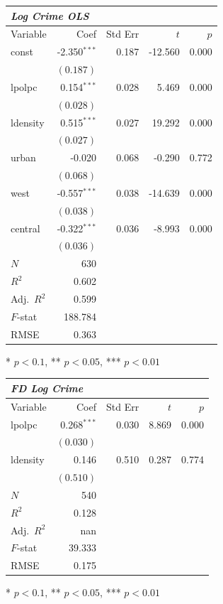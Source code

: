 \documentclass{article}
\begin{document}
\renewcommand{\arraystretch}{1.1}
\setlength{\tabcolsep}{6pt}
\begin{tabular}{lrrrr}
\hline
\multicolumn{5}{l}{\textit{Log Crime OLS}} \\
\hline
Variable & Coef & Std Err & $t$ & $p$ \\
\hline
const & -2.350$^{\ast\ast\ast}$ & 0.187 & -12.560 & 0.000 \\
 & $(0.187)$ & & & \\
lpolpc & 0.154$^{\ast\ast\ast}$ & 0.028 & 5.469 & 0.000 \\
 & $(0.028)$ & & & \\
ldensity & 0.515$^{\ast\ast\ast}$ & 0.027 & 19.292 & 0.000 \\
 & $(0.027)$ & & & \\
urban & -0.020 & 0.068 & -0.290 & 0.772 \\
 & $(0.068)$ & & & \\
west & -0.557$^{\ast\ast\ast}$ & 0.038 & -14.639 & 0.000 \\
 & $(0.038)$ & & & \\
central & -0.322$^{\ast\ast\ast}$ & 0.036 & -8.993 & 0.000 \\
 & $(0.036)$ & & & \\
\hline
$N$ & 630 & & & \\
$R^2$ & 0.602 & & & \\
Adj.\ $R^2$ & 0.599 & & & \\
$F$-stat & 188.784 & & & \\
RMSE & 0.363 & & & \\
\hline
\end{tabular}
\vspace{2pt}
\begin{flushleft}\footnotesize{* $p<0.1$, ** $p<0.05$, *** $p<0.01$}\end{flushleft}

\renewcommand{\arraystretch}{1.1}
\setlength{\tabcolsep}{6pt}
\begin{tabular}{lrrrr}
\hline
\multicolumn{5}{l}{\textit{FD Log Crime}} \\
\hline
Variable & Coef & Std Err & $t$ & $p$ \\
\hline
lpolpc & 0.268$^{\ast\ast\ast}$ & 0.030 & 8.869 & 0.000 \\
 & $(0.030)$ & & & \\
ldensity & 0.146 & 0.510 & 0.287 & 0.774 \\
 & $(0.510)$ & & & \\
\hline
$N$ & 540 & & & \\
$R^2$ & 0.128 & & & \\
Adj.\ $R^2$ & nan & & & \\
$F$-stat & 39.333 & & & \\
RMSE & 0.175 & & & \\
\hline
\end{tabular}
\vspace{2pt}
\begin{flushleft}\footnotesize{* $p<0.1$, ** $p<0.05$, *** $p<0.01$}\end{flushleft}
\end{document}
